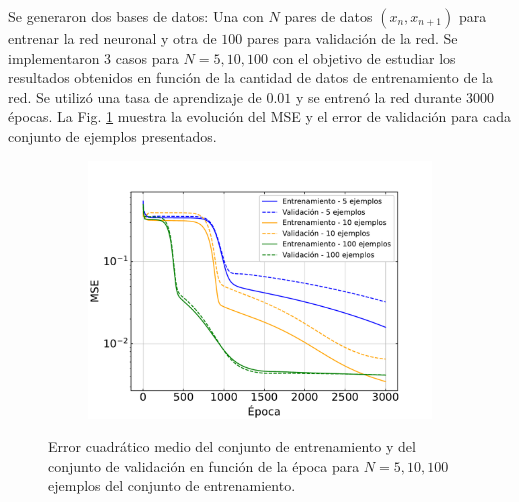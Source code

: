 \documentclass[11pt,twocolumn,twoside]{opticajnl}
\begin{document}
Se generaron dos bases de datos: Una con $N$ pares de datos $(x_n, x_{n+1})$ para entrenar la red neuronal y otra de $100$ pares para validación de la red. Se implementaron 3 casos para $N=5,10,100$ con el objetivo de estudiar los resultados obtenidos en función de la cantidad de datos de entrenamiento de la red. Se utilizó una tasa de aprendizaje de $0.01$ y se entrenó la red durante $3000$ épocas. La Fig. \ref{fig:mse_3} muestra la evolución del MSE y el error de validación para cada conjunto de ejemplos presentados. 
 
\begin{figure}[ht]
    \centering
         \begin{subfigure}[b]{\linewidth}
            \includegraphics[width=\textwidth]{Figuras/mse_ej3.pdf}
         \end{subfigure}
    \caption{Error cuadrático medio del conjunto de entrenamiento y del conjunto de validación en función de la época para $N=5,10,100$ ejemplos del conjunto de entrenamiento.} 
    \label{fig:mse_3}
\end{figure}
\end{document}
